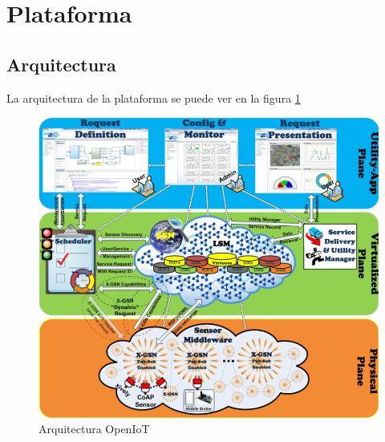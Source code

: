 \documentclass[12pt, twoside]{book}
\begin{document}
\section{Plataforma}
\subsection{Arquitectura}
La arquitectura de la plataforma se puede ver en la figura \ref{L400} 
\begin{figure}[H]
\centering
\includegraphics[scale=0.4]{images/openiot_platform1}
\caption{Arquitectura OpenIoT}\label{L400}
\end{figure}
\end{document}
